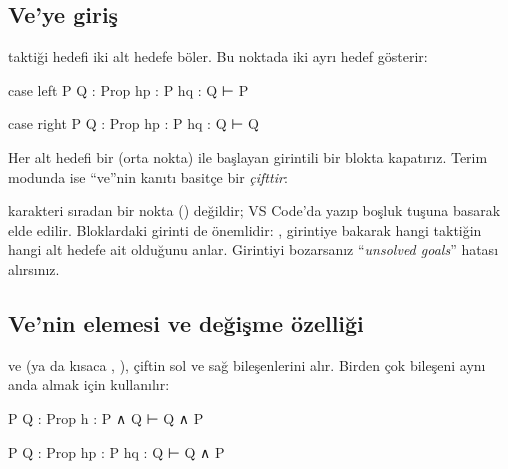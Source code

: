 \subsection{Ve'ye giriş}


 taktiği hedefi iki alt hedefe böler. Bu noktada
\Lean{} iki ayrı hedef gösterir:

\begin{hedefdurumu}
case left
P Q : Prop
hp : P
hq : Q
⊢ P

case right
P Q : Prop
hp : P
hq : Q
⊢ Q
\end{hedefdurumu}

Her alt hedefi bir  (orta nokta) ile başlayan girintili bir blokta
kapatırız. Terim modunda ise ``ve''nin kanıtı basitçe bir \emph{çifttir}:


\begin{dikkat}
 karakteri sıradan bir nokta () değildir; VS Code'da
 yazıp boşluk tuşuna basarak elde edilir. Bloklardaki
girinti de önemlidir: \Lean{}, girintiye bakarak hangi taktiğin hangi alt
hedefe ait olduğunu anlar. Girintiyi bozarsanız ``\emph{unsolved goals}''
hatası alırsınız.
\end{dikkat}

\subsection{Ve'nin elemesi ve değişme özelliği}


 ve  (ya da kısaca , ), çiftin sol
ve sağ bileşenlerini alır. Birden çok bileşeni aynı anda almak için
 kullanılır:


\begin{hedefgecisi}
\begin{hedefdurumu}
P Q : Prop
h : P ∧ Q
⊢ Q ∧ P
\end{hedefdurumu}
\sonra
\begin{hedefdurumu}
P Q : Prop
hp : P
hq : Q
⊢ Q ∧ P
\end{hedefdurumu}
\end{hedefgecisi}

